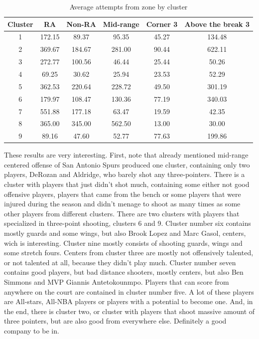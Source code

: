 \documentclass[a4paper]{article}
\begin{document}
\begin{table}[!h]
\begin{center}
\begin{tabular}{|c|c|c|c|c|c|} \hline
Cluster & RA & Non-RA & Mid-range & Corner 3 & Above the break 3 \\ \hline
 1 & 172.15 &  89.37 &  95.35 & 45.27 & 134.48 \\ \hline
 2 & 369.67 & 184.67 & 281.00 & 90.44 & 622.11 \\ \hline
 3 & 272.77 & 100.56 &  46.44 & 25.44 &  50.26 \\ \hline
 4 &  69.25 &  30.62 &  25.94 & 23.53 &  52.29 \\ \hline
 5 & 362.53 & 220.64 & 228.72 & 49.50 & 301.19 \\ \hline
 6 & 179.97 & 108.47 & 130.36 & 77.19 & 340.03 \\ \hline
 7 & 551.88 & 177.18 &  63.47 & 19.59 &  42.35 \\ \hline
 8 & 365.00 & 345.00 & 562.50 & 13.00 &  30.00 \\ \hline
 9 &  89.16 &  47.60 &  52.77 & 77.63 & 199.86 \\ \hline
\end{tabular}
\caption{Average attempts from zone by cluster}
\label{tab:avg_by_clst}
\end{center}
\end{table}

These results are very interesting. First, note that already mentioned mid-range centered offense of San Antonio Spurs produced one cluster, containing only two players, DeRozan and Aldridge, who barely shot any three-pointers. There is a cluster with players that just didn't shot much, containing some either not good offensive players, players that came from the bench or some players that were injured during the season and didn't menage to shoot as many times as some other players from different clusters. There are two clusters with players that specialized in three-point shooting, clusters 6 and 9. Cluster number six contains mostly guards and some wings, but also Brook Lopez and Marc Gasol, centers, wich is interesting. Cluster nine mostly consists of shooting guards, wings and some stretch fours. Centers from cluster three are mostly not offensively talented, or not talented at all, because they didn't play much. Cluster number seven contains good players, but bad distance shooters, mostly centers, but also Ben Simmons and MVP Giannis Antetokounmpo. Players that can score from anywhere on the court are contained in cluster number five. A lot of these players are All-stars, All-NBA players or players with a potential to become one. And, in the end, there is cluster two, or cluster with players that shoot massive amount of three pointers, but are also good from everywhere else. Definitely a good company to be in.
\end{document}
